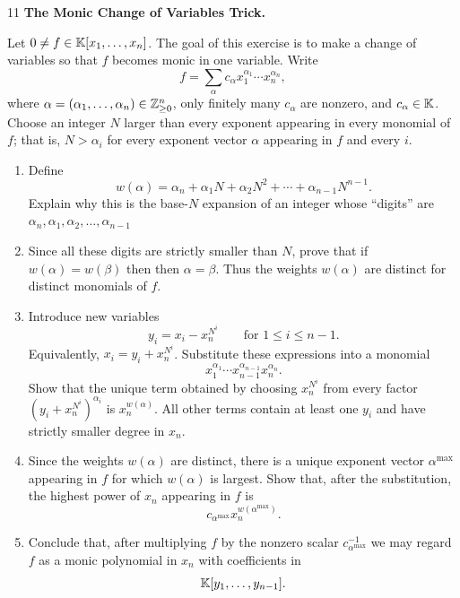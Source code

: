 \documentclass[Notebook.tex]{subfiles}
\begin{document}
\begin{problem}{11} \textbf{The Monic Change of Variables Trick.} 
    
    Let $0\neq f\in \mathbb K[x_1,\ldots,x_n]$. The goal of this exercise is to make a change of variables so that $f$ becomes monic in one variable. Write
    \[
    f=\sum_{\alpha} c_{\alpha}x_1^{\alpha_1}\cdots x_n^{\alpha_n},
    \]
    where $\alpha=(\alpha_1,\ldots,\alpha_n)\in \mathbb Z_{\geq 0}^n$, only finitely many $c_\alpha$ are nonzero, and $c_\alpha\in \mathbb K$. Choose an integer $N$ larger than every exponent appearing in every monomial of $f$; that is, $N>\alpha_i$ for every exponent vector $\alpha$ appearing in $f$ and every $i$.

    \begin{enumerate}
        \item Define
        \[
        w(\alpha)
        =
        \alpha_n+\alpha_1N+\alpha_2N^2+\cdots+\alpha_{n-1}N^{n-1}.
        \]
        Explain why this is the base-$N$ expansion of an integer whose ``digits'' are $\alpha_n,\alpha_1,\alpha_2,\ldots,\alpha_{n-1}$

      \item Since all these digits are strictly smaller than $N$, prove that if $w(\alpha)=w(\beta)$ then then $\alpha=\beta$. Thus the weights $w(\alpha)$ are distinct for distinct monomials of $f$.

        \item Introduce new variables
        \[
        y_i=x_i-x_n^{N^i}
        \qquad\text{for }1\leq i\leq n-1.
        \]
        Equivalently, $ x_i=y_i+x_n^{N^i}$. Substitute these expressions into a monomial
        \[
        x_1^{\alpha_1}\cdots x_{n-1}^{\alpha_{n-1}}x_n^{\alpha_n}.
        \]
        Show that the unique term obtained by choosing $x_n^{N^i}$ from every factor $(y_i+x_n^{N^i})^{\alpha_i}$ is $x_n^{w(\alpha)}$. All other terms contain at least one $y_i$ and have strictly smaller degree in $x_n$.

        \item Since the weights $w(\alpha)$ are distinct, there is a unique exponent vector $\alpha^{\max}$ appearing in $f$ for which $w(\alpha)$ is largest. Show that, after the substitution, the highest power of $x_n$ appearing in $f$ is
        \[
        c_{\alpha^{\max}}x_n^{w(\alpha^{\max})}.
        \]

        \item Conclude that, after multiplying $f$ by the nonzero scalar $c_{\alpha^{\max}}^{-1}$ we may regard $f$ as a monic polynomial in $x_n$ with coefficients in
        \[
        \mathbb K[y_1,\ldots,y_{n-1}].
        \]


\end{enumerate}
\end{problem}
\end{document}
